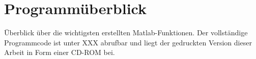 \chapter{Programmüberblick}
Überblick über die wichtigsten erstellten Matlab-Funktionen. Der vollständige Programmcode ist unter XXX abrufbar und liegt der gedruckten Version dieser Arbeit in Form einer CD-ROM bei.
 
